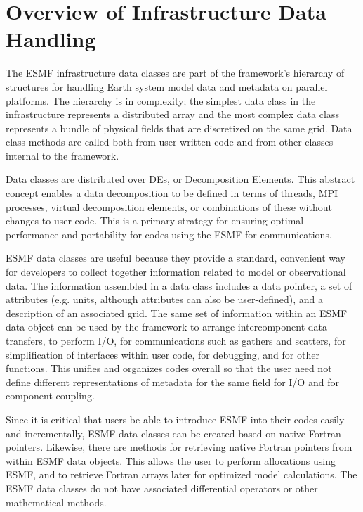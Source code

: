 
\section{Overview of Infrastructure Data Handling}

The ESMF infrastructure data classes are part of the framework's 
hierarchy of structures for handling Earth system model data and 
metadata on parallel platforms.  The hierarchy is in complexity; the 
simplest data class in the infrastructure represents a distributed 
array and the most complex data class represents a bundle of physical 
fields that are discretized on the same grid.  Data class methods 
are called both from user-written code and from other classes 
internal to the framework. 

Data classes are distributed over DEs, or Decomposition Elements.  
This abstract concept enables a data decomposition to be defined in 
terms of threads, MPI processes, virtual decomposition elements, or
combinations of these without changes to user code.  This is a
primary strategy for ensuring optimal performance and portability
for codes using the ESMF for communications.

ESMF data classes are useful because they provide a standard, 
convenient way for developers to collect together information 
related to model or observational data.  The information assembled 
in a data class includes a data pointer, a set of attributes 
(e.g. units, although attributes can also be user-defined), and a 
description of an associated grid.  The same set of information within 
an ESMF data object can be used by the framework to arrange 
intercomponent data transfers, to perform I/O, for communications
such as gathers and scatters, for simplification of interfaces 
within user code, for debugging, and for other functions.  
This unifies and organizes codes overall so that the user need not
define different representations of metadata for the same field 
for I/O and for component coupling.  

Since it is critical that users be able to introduce ESMF into their
codes easily and incrementally, ESMF data classes can be created based 
on native Fortran pointers.  Likewise, there are methods for retrieving 
native Fortran pointers from within ESMF data objects.  This allows
the user to perform allocations using ESMF, and to retrieve Fortran
arrays later for optimized model calculations.  The ESMF data classes 
do not have associated differential operators or other mathematical 
methods.

